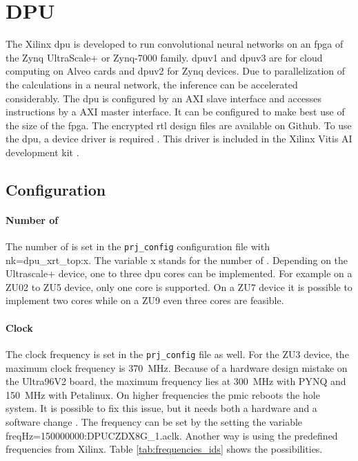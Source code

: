 \section{DPU}
\label{sec:embedded_platform:dpu}

The Xilinx \acrfull{dpu} is developed to run convolutional neural networks on an \acrshort{fpga} of the Zynq UltraScale+ or Zynq-7000 family.
\acrshort{dpu}v1 and \acrshort{dpu}v3 are for cloud computing on Alveo cards and \acrshort{dpu}v2 for Zynq devices. 
Due to parallelization of the calculations in a neural network, the inference can be accelerated considerably.
The \acrshort{dpu} is configured by an AXI slave interface and accesses instructions by a AXI master interface.
It can be configured to make best use of the size of the \acrshort{fpga}.
The encrypted \acrshort{rtl} design files are available on Github.
To use the \acrshort{dpu}, a device driver is required \cite{dpu_product_guide}.
This driver is included in the Xilinx Vitis AI development kit \cite{dpu_product_guide_v3_2}.

\subsection{Configuration}
\label{subsec:embedded_platform:dpu:configuration}
\paragraph{Number of }
The number of  is set in the \texttt{prj\_config} configuration file with nk=dpu\_xrt\_top:x.
The variable x stands for the number of .
Depending on the Ultrascale+ device, one to three \acrshort{dpu} cores can be implemented.
For example on a ZU02 to ZU5 device, only one core is supported.
On a ZU7 device it is possible to implement two cores while on a ZU9 even three cores are feasible.

\paragraph{Clock}
The clock frequency is set in the \texttt{prj\_config} file as well.
For the ZU3 device, the maximum clock frequency is \SI{370}{MHz}.
Because of a hardware design mistake on the Ultra96V2 board, the maximum frequency lies at \SI{300}{MHz} with PYNQ and \SI{150}{MHz} with Petalinux.
On higher frequencies the \acrfull{pmic} reboots the hole system.
It is possible to fix this issue, but it needs both a hardware and a software change \cite{pmic_issue}.
The frequency can be set  by the setting the variable  freqHz=150000000:DPUCZDX8G\_1.aclk.
Another way is using the predefined frequencies from Xilinx.
Table \ref{tab:frequencies_ids} shows the possibilities.

